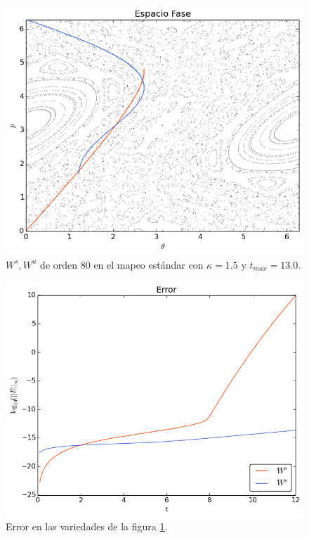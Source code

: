 \begin{figure}[H]
\centering
\includegraphics[scale=0.6]{estandark15}
\caption{$W^{s},W^{u}$ de orden $80$ en el mapeo estándar con $\kappa=1.5$ y $t_{max}=13.0$.}
\label{estandar15}
\end{figure}

\begin{figure}[H]
\centering
\includegraphics[scale=0.6]{error_est_k15} 
\caption{Error en las variedades de la figura \ref{estandar15}.}
\label{error est k15}
\end{figure}




